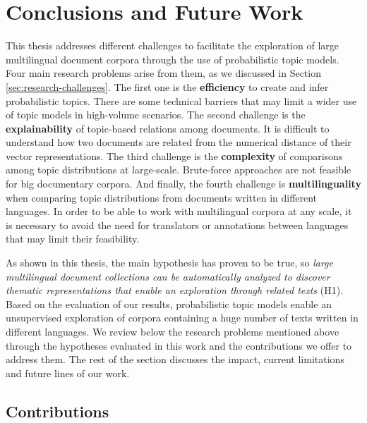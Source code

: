 

\chapter{Conclusions and Future Work}\label{ch:conclusion}

\graphicspath{{conclusions/figures/}}

This thesis addresses different challenges to facilitate the exploration of large multilingual document corpora through the use of probabilistic topic models. Four main research problems arise from them, as we discussed in Section \ref{sec:research-challenges}. The first one is the \textbf{efficiency} to create and infer probabilistic topics. There are some technical barriers that may limit a wider use of topic models in high-volume scenarios. The second challenge is the \textbf{explainability} of topic-based relations among documents. It is difficult to understand how two documents are related from the numerical distance of their vector representations. The third challenge is the \textbf{complexity} of comparisons among topic distributions at large-scale. Brute-force approaches are not feasible for big documentary corpora. And finally, the fourth challenge is \textbf{multilinguality} when comparing topic distributions from documents written in different languages. In order to be able to work with multilingual corpora at any scale, it is necessary to avoid the need for translators or annotations between languages that may limit their feasibility.

As shown in this thesis, the main hypothesis has proven to be true, so \textit{large multilingual document collections can be automatically analyzed to discover thematic representations that enable an exploration through related texts} (H1). Based on the evaluation of our results, probabilistic topic models enable an unsupervised exploration of corpora containing a huge number of texts written in different languages. We review below the research problems mentioned above through the hypotheses evaluated in this work and the contributions we offer to address them. The rest of the section discusses the impact, current limitations and future lines of our work. 


\section{Contributions}


